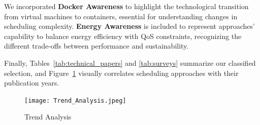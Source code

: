 \documentclass[runningheads]{llncs}
\begin{document}
We incorporated \textbf{Docker Awareness} to highlight the technological transition from virtual machines to containers, essential for understanding changes in scheduling complexity. \textbf{Energy Awareness} is included to represent approaches' capability to balance energy efficiency with QoS constraints, recognizing the different trade-offs between performance and sustainability.

Finally, Tables~\ref{tab:technical_papers} and \ref{tab:surveys} summarize our classified selection, and Figure~\ref{fig:trend_analysis} visually correlates scheduling approaches with their publication years.

\begin{figure}[H]
    \centering
    \texttt{[image: Trend\_Analysis.jpeg]}
    \caption{Trend Analysis}
    \label{fig:trend_analysis}
\end{figure}
\end{document}
